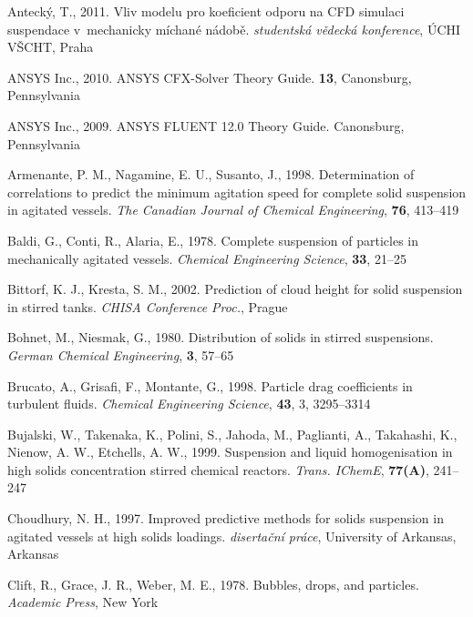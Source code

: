 \begin{thebibliography}{99}

 Antecký, T., 2011. Vliv modelu pro koeficient odporu na CFD simulaci suspendace v~mechanicky míchané nádobě. \textit{studentská vědecká konference}, ÚCHI VŠCHT, Praha 

 ANSYS Inc., 2010. ANSYS CFX-Solver Theory Guide. \textbf{13}, Canonsburg, Pennsylvania

 ANSYS Inc., 2009. ANSYS FLUENT 12.0 Theory Guide. Canonsburg, Pennsylvania

 Armenante, P. M., Nagamine, E. U., Susanto, J., 1998. Determination of correlations to predict the minimum agitation speed for complete solid suspension in agitated vessels. \textit{The Canadian Journal of Chemical Engineering}, \textbf{76}, 413--419

 Baldi, G., Conti, R., Alaria, E., 1978. Complete suspension of particles in mechanically agitated vessels. \textit{Chemical Engineering Science}, \textbf{33}, 21--25 

 Bittorf, K. J., Kresta, S. M., 2002. Prediction of cloud height for solid suspension in stirred tanks. \textit{CHISA Conference Proc.}, Prague

 Bohnet, M., Niesmak, G., 1980. Distribution of solids in stirred suspensions. \textit{German
Chemical Engineering}, \textbf{3}, 57--65

 Brucato, A., Grisafi, F., Montante, G., 1998. Particle drag coefficients in turbulent fluids. \textit{Chemical Engineering Science}, \textbf{43}, 3, 3295--3314

 Bujalski, W., Takenaka, K., Polini, S., Jahoda, M., Paglianti, A., Takahashi, K., Nienow, A. W., Etchells, A. W., 1999. Suspension and liquid homogenisation in high solids concentration stirred chemical reactors. \textit{Trans. IChemE}, \textbf{77(A)}, 241--247

 Choudhury, N. H., 1997. Improved predictive methods for solids suspension in agitated vessels at high solids loadings. \textit{disertační práce},  University of Arkansas, Arkansas

 Clift, R., Grace, J. R., Weber, M. E.,  1978.  Bubbles, drops, and particles. \textit{Academic Press}, New York


\end{thebibliography}
